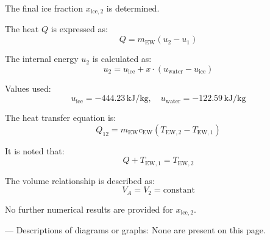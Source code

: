 The final ice fraction \( x_{\text{ice},2} \) is determined.  

The heat \( Q \) is expressed as:  
\[
Q = m_{\text{EW}} (u_2 - u_1)
\]  

The internal energy \( u_2 \) is calculated as:  
\[
u_2 = u_{\text{ice}} + x \cdot (u_{\text{water}} - u_{\text{ice}})
\]  

Values used:  
\[
u_{\text{ice}} = -444.23 \, \text{kJ/kg}, \quad u_{\text{water}} = -122.59 \, \text{kJ/kg}
\]  

The heat transfer equation is:  
\[
Q_{12} = m_{\text{EW}} c_{\text{EW}} (T_{\text{EW},2} - T_{\text{EW},1})
\]  

It is noted that:  
\[
Q + T_{\text{EW},1} = T_{\text{EW},2}
\]  

The volume relationship is described as:  
\[
V_A = V_2 = \text{constant}
\]  

No further numerical results are provided for \( x_{\text{ice},2} \).  

---  
Descriptions of diagrams or graphs: None are present on this page.